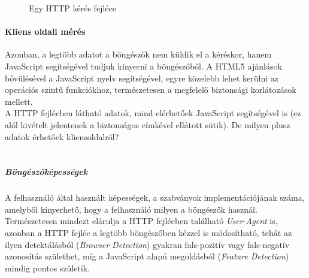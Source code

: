 \begin{figure}[ht]
	\centering
		
		\caption{Egy HTTP kérés fejléce}
		\label{fig:request_header}
\end{figure}

\paragraph{Kliens oldali mérés} %
\label{par:kliens_oldali_mérés}

Azonban, a legtöbb adatot a böngészők nem küldik el a kéréskor, hanem JavaScript segítségével tudjuk kinyerni a böngészőből. A HTML5 ajánlások bővülésével a JavaScript nyelv segítségével, egyre közelebb lehet kerülni az operációs szintű funkciókhoz, természetesen a megfelelő biztonsági korlátozások mellett.\\

A HTTP fejlécben látható adatok, mind elérhetőek JavaScript segítségével is (ez alól kivételt jelentenek a biztonságos címkével ellátott sütik). De milyen plusz adatok érhetőek kliensoldalról?\hfill\\
\\
\subparagraph{Böngészőképességek} %
\label{subp:böngészőképességek}
A felhasználó által használt képességek, a szabványok implementációjának száma, amelyből kinyerhető, hogy a felhasználó milyen a böngészők használ. Természetesen mindezt elárulja a HTTP fejlécben található \textit{User-Agent} is, azonban a HTTP fejléc a legtöbb böngészőben kézzel is módosítható, tehát az ilyen detektálásból (\textit{Browser Detection}) gyakran fals-pozitív vagy fals-negatív azonosítás születhet, míg a JavaScript alapú megoldásból (\textit{Feature Detection}) mindig pontos születik.

